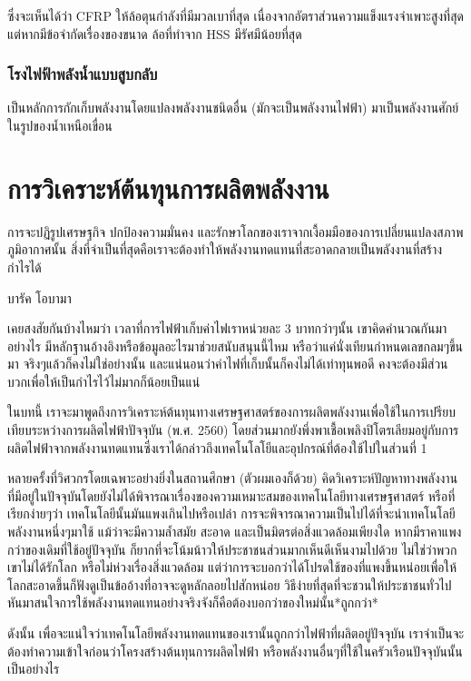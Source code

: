 \documentclass[a4paper,nobib,openany]{tufte-book}
\begin{document}
ซึ่งจะเห็นได้ว่า CFRP ให้ล้อตุนกำลังที่มีมวลเบาที่สุด
เนื่องจากอัตราส่วนความแข็งแรงจำเพาะสูงที่สุด
แต่หากมีข้อจำกัดเรื่องของขนาด ล้อที่ทำจาก HSS มีรัศมีน้อยที่สุด

\section{โรงไฟฟ้าพลังน้ำแบบสูบกลับ}
\label{sec:orgdfa30d6}
เป็นหลักการกักเก็บพลังงานโดยแปลงพลังงานชนิดอื่น (มักจะเป็นพลังงานไฟฟ้า)
มาเป็นพลังงานศักย์ในรูปของน้ำเหนือเขื่อน



\part{การวิเคราะห์ต้นทุนการผลิตพลังงาน}
\label{sec:orgcbcd341}

\epigraph{การจะปฏิรูปเศรษฐกิจ ปกป้องความมั่นคง และรักษาโลกของเราจากเงื้อมมือของการเปลี่ยนแปลงสภาพภูมิอากาศนั้น สิ่งที่จำเป็นที่สุดคือเราจะต้องทำให้พลังงานทดแทนที่สะอาดกลายเป็นพลังงานที่สร้างกำไรได้}{บารัค โอบามา}

เคยสงสัยกันบ้างไหมว่า เวลาที่การไฟฟ้าเก็บค่าไฟเราหน่วยละ 3 บาทกว่าๆนั้น
เขาคิดคำนวณกันมาอย่างไร
มีหลักฐานอ้างอิงหรือข้อมูลอะไรมาช่วยสนับสนุนนี้ไหม
หรือว่าแค่นั่งเทียนกำหนดเลขกลมๆขึ้นมา จริงๆแล้วก็คงไม่ใช่อย่างนั้น
และแน่นอนว่าค่าไฟที่เก็บนั้นก็คงไม่ได้เท่าทุนพอดี
คงจะต้องมีส่วนบวกเพื่อให้เป็นกำไรไว้ไม่มากก็น้อยเป็นแน่

ในบทนี้ เราจะมาพูดถึงการวิเคราะห์ต้นทุนทางเศรษฐศาสตร์ของการผลิตพลังงานเพื่อใช้ในการเปรียบเทียบระหว่างการผลิตไฟฟ้าปัจจุบัน (พ.ศ. 2560) โดยส่วนมากยังพึ่งพาเชื้อเพลิงปิโตรเลียมอยู่กับการผลิตไฟฟ้าจากพลังงานทดแทนซึ่งเราได้กล่าวถึงเทคโนโลโยีและอุปกรณ์ที่ต้องใช้ไปในส่วนที่ 1

หลายครั้งที่วิศวกรโดยเฉพาะอย่างยิ่งในสถานศึกษา (ตัวผมเองก็ด้วย) คิดวิเคราะห์ปัญหาทางพลังงานที่มีอยู่ในปัจจุบันโดยยังไม่ได้พิจารณาเรื่องของความเหมาะสมของเทคโนโลยีทางเศรษฐศาสตร์ หรือที่เรียกง่ายๆว่า เทคโนโลยีนั้นมันแพงเกินไปหรือเปล่า การจะพิจารณาความเป็นไปได้ที่จะนำเทคโนโลยีพลังงานหนึ่งๆมาใช้ แม้ว่าจะมีความล้ำสมัย สะอาด และเป็นมิตรต่อสิ่งแวดล้อมเพียงใด หากมีราคาแพงกว่าของเดิมที่ใช้อยู่ปัจจุบัน ก็ยากที่จะโน้มน้าวให้ประชาชนส่วนมากเห็นดีเห็นงามไปด้วย ไม่ใช่ว่าพวกเขาไม่ได้รักโลก หรือไม่ห่วงเรื่องสิ่งแวดล้อม แต่ว่าการจะบอกว่าได้โปรดใช้ของที่แพงขึ้นหน่อยเพื่อให้โลกสะอาดขึ้นก็ฟังดูเป็นข้ออ้างที่อาจจะดูหลักลอยไปสักหน่อย วิธีง่ายที่สุดที่จะชวนให้ประชาชนทั่วไปหันมาสนใจการใช้พลังงานทดแทนอย่างจริงจังก็คือต้องบอกว่าของใหม่นั้น*ถูกกว่า*

ดังนั้น เพื่อจะแน่ใจว่าเทคโนโลยีพลังงานทดแทนของเรานั้นถูกกว่าไฟฟ้าที่ผลิตอยู่ปัจจุบัน เราจำเป็นจะต้องทำความเข้าใจก่อนว่าโครงสร้างต้นทุนการผลิตไฟฟ้า หรือพลังงานอื่นๆที่ใช้ในครัวเรือนปัจจุบันนั้นเป็นอย่างไร
\end{document}
